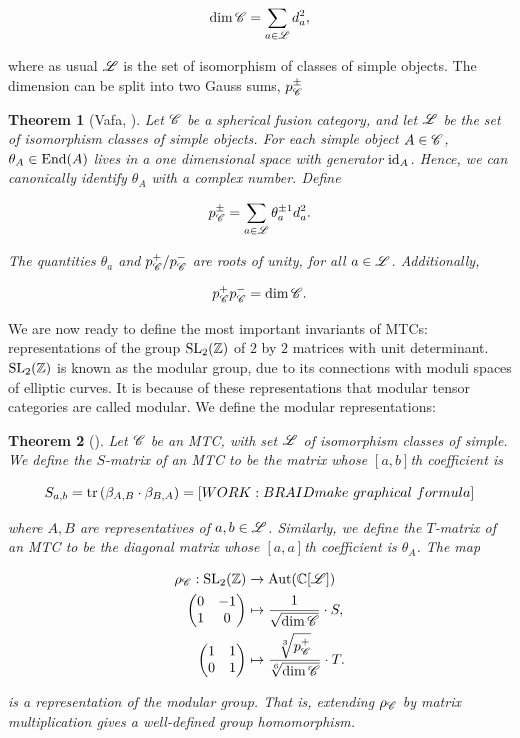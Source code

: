 \documentclass{article}
\newtheorem{theorem}{Theorem}[section]
\theoremstyle{definition}
\numberwithin{figure}{section}
\begin{document}
$$\dim \mathscr{C} = \sum_{a\in \mathscr{L}} d_a^2,$$

where as usual $\mathscr{L}$ is the set of isomorphism of classes of simple objects. The dimension can be split into two Gauss sums, $p^{\pm}_{\mathscr{C}}$

\begin{theorem}[Vafa, \cite{vafa1988toward}] Let $\mathscr{C}$ be a spherical fusion category, and let $\mathscr{L}$ be the set of isomorphism classes of simple objects. For each simple object $A\in \mathscr{C}$, $\theta_A\in \mathrm{End}(A)$ lives in a one dimensional space with generator $\mathrm{id}_A$. Hence, we can canonically identify $\theta_A$ with a complex number. Define

$$p^{\pm}_{\mathscr{C}}=\sum_{a\in \mathscr{L}}\theta_a^{\pm 1}d_a^2.$$

The quantities $\theta_a$ and $p^{+}_{\mathscr{C}}/p^{-}_{\mathscr{C}}$ are roots of unity, for all $a\in \mathscr{L}$. Additionally,

$$p^{+}_{\mathscr{C}}p^{-}_{\mathscr{C}}=\dim \mathscr{C}.$$
\end{theorem}

We are now ready to define the most important invariants of MTCs: representations of the group $\mathrm{SL}_2(\mathbb{Z})$ of $2$ by $2$ matrices with unit determinant. $\mathrm{SL}_2(\mathbb{Z})$ is known as the modular group, due to its connections with moduli spaces of elliptic curves. It is because of these representations that modular tensor categories are called modular. We define the modular representations:

\begin{theorem}[\cite{bakalov2001lectures}] Let $\mathscr{C}$ be an MTC, with set $\mathscr{L}$ of isomorphism classes of simple. We define the $S$-matrix of an MTC to be the matrix whose $[a,b]$th coefficient is

$$S_{a,b}=\mathrm{tr}\left(\beta_{A,B}\cdot \beta_{B,A}\right)=[WORK: BRAID make \,\, graphical \,\, formula]$$

where $A,B$ are representatives of $a,b\in \mathscr{L}$. Similarly, we define the $T$-matrix of an MTC to be the diagonal matrix whose $[a,a]$th coefficient is $\theta_A$. The map

\begin{align*}
\rho_{\mathscr{C}}: \mathrm{SL}_2(\mathbb{Z})&\xrightarrow{} \mathrm{Aut}(\mathbb{C}[\mathscr{L}])\\
\begin{pmatrix}
0 & -1\\
1 & 0
\end{pmatrix}
&\mapsto \frac{1}{\sqrt{\dim \mathscr{C} }}\cdot S, \\
\begin{pmatrix}
1 & 1\\
0 & 1
\end{pmatrix}
&\mapsto \frac{\sqrt[3]{p^+_{\mathscr{C}}}}{\sqrt[6]{\dim \mathscr{C} }}\cdot T.
\end{align*}

is a representation of the modular group. That is, extending $\rho_{\mathscr{C}}$ by matrix multiplication gives a well-defined group homomorphism.
\end{theorem}
\end{document}

